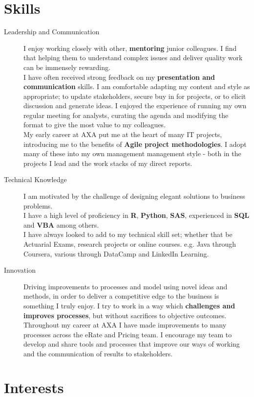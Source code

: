 \documentclass[11pt]{article}
\begin{document}
\section*{Skills}
\begin{description}
\item[Leadership and Communication] I enjoy working closely with other, \textbf{mentoring} junior colleagues. I find that helping them to understand complex issues and deliver quality work can be immensely rewarding. \\
I have often received strong feedback on my \textbf{presentation and communication} skills. I am comfortable adapting my content and style as appropriate; to update stakeholders, secure buy in for projects, or to elicit discussion and generate ideas.
I enjoyed the experience of running my own regular meeting for analysts, curating the agenda and modifying the format to give the most value to my colleagues.\\
My early career at AXA put me at the heart of many IT projects, introducing me to the benefits of \textbf{Agile project methodologies}. I adopt many of these into my own management management style - both in the projects I lead and the work stacks of my direct reports.
\item[Technical Knowledge] I am motivated by the challenge of designing elegant solutions to business problems. \\
I have a high level of proficiency in \textbf{R}, \textbf{Python}, \textbf{SAS}, experienced in \textbf{SQL} and \textbf{VBA} among others.\\
I have always looked to add to my technical skill set; whether that be Actuarial Exams, research projects or online courses. e.g. Java through Coursera, various through DataCamp and LinkedIn Learning.
\item[Innovation] Driving improvements to processes and model using novel ideas and methods, in order to deliver a competitive edge to the business is something I truly enjoy. 
I try to work in a way which \textbf{challenges and improves processes}, but without sacrifices to objective outcomes.\\
Throughout my career at AXA I have made improvements to many processes across the eRate and Pricing team. I encourage my team to develop and share tools and processes that improve our ways of working and the communication of results to stakeholders.
\end{description} 

\section*{Interests}
\end{document}
